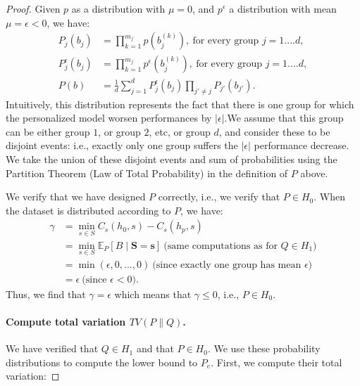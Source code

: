 \begin{proof}
Given $p$  as a distribution with $\mu=0$, and $p^{\epsilon}$  a distribution with mean $\mu = \epsilon < 0$, we have:
\begin{align*}
    P_j(b_j) 
        &= \prod_{k=1}^{m_j} p(b_j^{(k)}),~\text{for every group $j=1....d$},\\
    P_j^{\epsilon}(b_j) 
        &= \prod_{k=1}^{m_j} p^{\epsilon}(b_j^{(k)}),~\text{for every group $j=1....d$},\\
    P(b) 
        &= \frac{1}{d}\sum_{j=1}^d P_j^{\epsilon}(b_j)\prod_{j'\neq j}P_{j'}(b_{j'}).
\end{align*}
Intuitively, this distribution represents the fact that there is one group for which the personalized model worsen performances by $|\epsilon|$.We assume that this group can be either group $1$, or group $2$, etc, or group $d$, and consider these to be disjoint events: i.e., exactly only one group suffers the $|\epsilon|$ performance decrease. We take the union of these disjoint events and sum of probabilities using the Partition Theorem (Law of Total Probability) in the definition of $P$ above.

We verify that we have designed $P$ correctly, i.e., we verify that $P \in H_0$. When the dataset is distributed according to $P$, we have:
\begin{align*}
    \gamma 
        &= \min_{s \in S} 
            C_{s}(h_0, s) - C_{s}(h_p, s)\\
        &= \min_{s \in S} 
            \mathbb{E}_P[B \mid \mathbf{S}=\mathbf{s}]
            ~\text{(same computations as for $Q \in H_1$)}\\
        &= \min(\epsilon, 0, ..., 0) 
            ~\text{(since exactly one group has mean $\epsilon$)}\\
        &= \epsilon
            ~\text{(since $\epsilon < 0$)}.
\end{align*}
    Thus, we find that $\gamma = \epsilon$ which means that $\gamma \leq 0$, i.e., $P \in H_0$.


\paragraph{Compute total variation $TV(P\parallel Q)$.} We have verified that $Q \in H_1$ and that $P \in H_0$. We use these probability distributions to compute the lower bound to $P_e$. First, we compute their total variation:


\end{proof}
